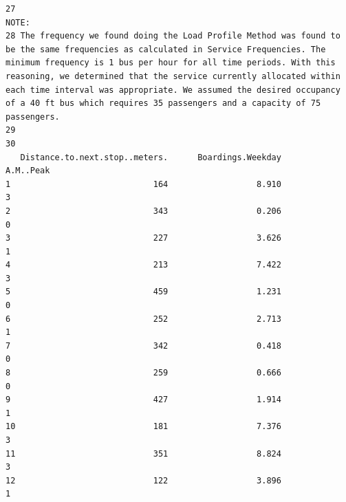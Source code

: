 \documentclass[
11pt, %
oneside, %
english, %
singlespacing, %
]{macthesis} %
\begin{document}
\begin{verbatim}
27                                                                                                                                                                                                                                                                                                                                                                                                                          NOTE:
28 The frequency we found doing the Load Profile Method was found to be the same frequencies as calculated in Service Frequencies. The minimum frequency is 1 bus per hour for all time periods. With this reasoning, we determined that the service currently allocated within each time interval was appropriate. We assumed the desired occupancy of a 40 ft bus which requires 35 passengers and a capacity of 75 passengers.
29                                                                                                                                                                                                                                                                                                                                                                                                                               
30                                                                                                                                                                                                                                                                                                                                                                                                                               
   Distance.to.next.stop..meters.      Boardings.Weekday       A.M..Peak
1                             164                  8.910               3
2                             343                  0.206               0
3                             227                  3.626               1
4                             213                  7.422               3
5                             459                  1.231               0
6                             252                  2.713               1
7                             342                  0.418               0
8                             259                  0.666               0
9                             427                  1.914               1
10                            181                  7.376               3
11                            351                  8.824               3
12                            122                  3.896               1

\end{verbatim}
\end{document}
